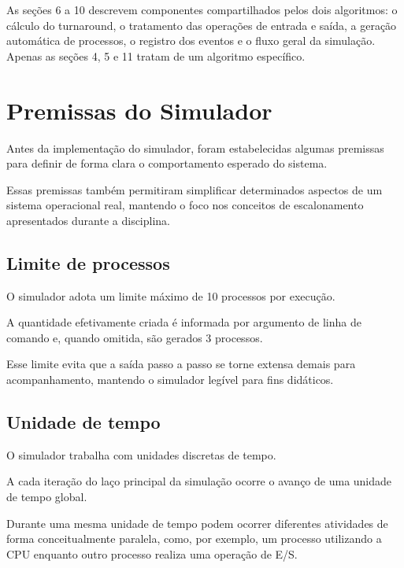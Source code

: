 \documentclass[12pt,a4paper]{article}
\begin{document}
As seções 6 a 10 descrevem componentes compartilhados pelos dois
algoritmos: o cálculo do turnaround, o tratamento das operações de
entrada e saída, a geração automática de processos, o registro dos
eventos e o fluxo geral da simulação. Apenas as seções 4, 5 e 11
tratam de um algoritmo específico.



\section{Premissas do Simulador}

Antes da implementação do simulador, foram estabelecidas algumas
premissas para definir de forma clara o comportamento esperado do
sistema.

Essas premissas também permitiram simplificar determinados aspectos
de um sistema operacional real, mantendo o foco nos conceitos de
escalonamento apresentados durante a disciplina.

\subsection{Limite de processos}

O simulador adota um limite máximo de 10 processos por execução.

A quantidade efetivamente criada é informada por argumento de linha de
comando e, quando omitida, são gerados 3 processos.

Esse limite evita que a saída passo a passo se torne extensa demais
para acompanhamento, mantendo o simulador legível para fins didáticos.



\subsection{Unidade de tempo}

O simulador trabalha com unidades discretas de tempo.

A cada iteração do laço principal da simulação ocorre o avanço de uma
unidade de tempo global.

Durante uma mesma unidade de tempo podem ocorrer diferentes
atividades de forma conceitualmente paralela, como, por exemplo, um
processo utilizando a CPU enquanto outro processo realiza uma
operação de E/S.
\end{document}
